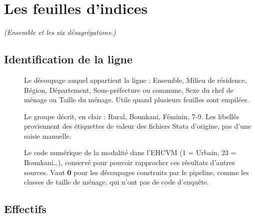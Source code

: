 \documentclass[11pt,a4paper]{article}
\begin{document}
\section{Les feuilles d'indices}

\emph{(\textsf{Ensemble} et les six désagrégations.)}

\subsection{Identification de la ligne}

\begin{description}
  \item[] Le découpage auquel appartient la ligne : \textsf{Ensemble},
  \textsf{Milieu de résidence}, \textsf{Région}, \textsf{Département},
  \textsf{Sous-préfecture ou commune}, \textsf{Sexe du chef de ménage} ou
  \textsf{Taille du ménage}. Utile quand plusieurs feuilles sont empilées.

  \item[] Le groupe décrit, en clair : \textsf{Rural}, \textsf{Bounkani},
  \textsf{Féminin}, \textsf{7-9}. Les libellés proviennent des étiquettes de valeur des fichiers
  Stata d'origine, pas d'une saisie manuelle.

  \item[] Le code numérique de la modalité dans l'EHCVM (1 = Urbain, 23 = Bounkani\ldots),
  conservé pour pouvoir rapprocher ces résultats d'autres sources. Vaut \textbf{0} pour les
  découpages construits par le pipeline, comme les classes de taille de ménage, qui n'ont pas de
  code d'enquête.
\end{description}

\subsection{Effectifs}
\end{document}
